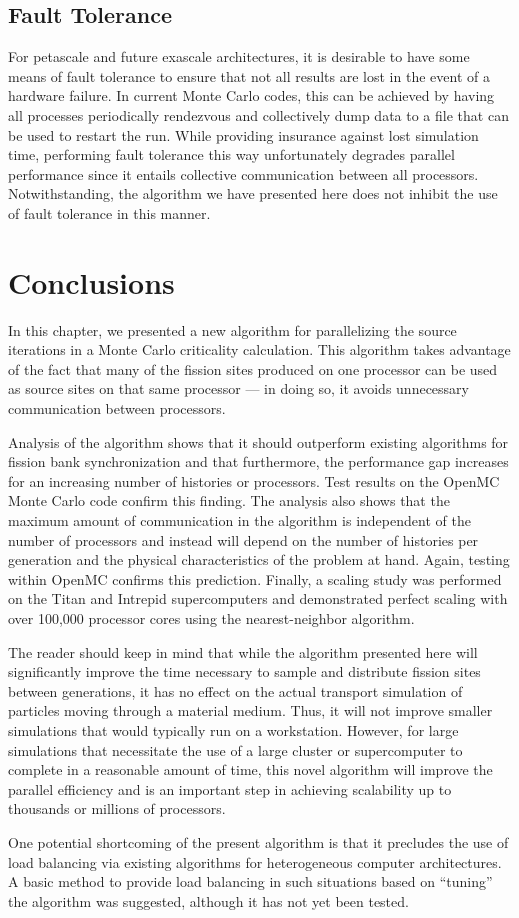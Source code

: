 \subsection{Fault Tolerance}

For petascale and future exascale architectures, it is desirable to have some
means of fault tolerance to ensure that not all results are lost in the event of
a hardware failure. In current Monte Carlo codes, this can be achieved by having
all processes periodically rendezvous and collectively dump data to a file that
can be used to restart the run. While providing insurance against lost
simulation time, performing fault tolerance this way unfortunately degrades
parallel performance since it entails collective communication between all
processors. Notwithstanding, the algorithm we have presented here does not
inhibit the use of fault tolerance in this manner.

\section{Conclusions}
\label{sec:conclusions}

In this chapter, we presented a new algorithm for parallelizing the source
iterations in a Monte Carlo criticality calculation. This algorithm takes
advantage of the fact that many of the fission sites produced on one processor
can be used as source sites on that same processor --- in doing so, it avoids
unnecessary communication between processors.

Analysis of the algorithm shows that it should outperform existing algorithms
for fission bank synchronization and that furthermore, the performance gap
increases for an increasing number of histories or processors. Test results on
the OpenMC Monte Carlo code confirm this finding. The analysis also shows that
the maximum amount of communication in the algorithm is independent of the
number of processors and instead will depend on the number of histories per
generation and the physical characteristics of the problem at hand. Again,
testing within OpenMC confirms this prediction. Finally, a scaling study was
performed on the Titan and Intrepid supercomputers and demonstrated perfect
scaling with over 100,000 processor cores using the nearest-neighbor algorithm.

The reader should keep in mind that while the algorithm presented here will
significantly improve the time necessary to sample and distribute fission sites
between generations, it has no effect on the actual transport simulation of
particles moving through a material medium. Thus, it will not improve smaller
simulations that would typically run on a workstation. However, for large
simulations that necessitate the use of a large cluster or supercomputer to
complete in a reasonable amount of time, this novel algorithm will improve the
parallel efficiency and is an important step in achieving scalability up to
thousands or millions of processors.

One potential shortcoming of the present algorithm is that it precludes the use
of load balancing via existing algorithms for heterogeneous computer
architectures. A basic method to provide load balancing in such situations based
on ``tuning'' the algorithm was suggested, although it has not yet been tested.
